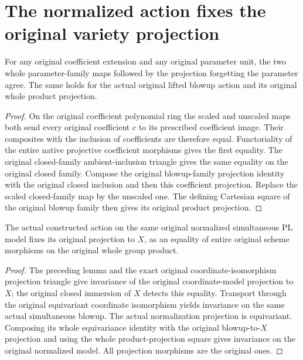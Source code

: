 \section{The normalized action fixes the original variety projection}

\begin{lemma}
\label{lem:pl-original-parameter-family-forgets-scaling}
\leanok
For any original coefficient extension and any original parameter unit,
the two whole parameter-family maps followed by the projection forgetting
the parameter agree. The same holds for the actual original lifted blowup
action and its original whole product projection.
\end{lemma}
\begin{proof}
On the original coefficient polynomial ring the scaled and unscaled maps
both send every original coefficient $c$ to its prescribed coefficient image.
Their composites with the inclusion of coefficients are therefore equal.
Functoriality of the entire native projective coefficient morphisms gives
the first equality. The original closed-family ambient-inclusion triangle
gives the same equality on the original closed family. Compose the original
blowup-family projection identity with the original closed inclusion and
then this coefficient projection. Replace the scaled closed-family map by
the unscaled one. The defining Cartesian square of the original blowup
family then gives its original product projection.
\end{proof}

\begin{theorem}
\label{thm:pl-original-normalized-projection-action-invariant}
\leanok
{}
The actual constructed action on the same original normalized simultaneous
PL model fixes its original projection to $X$, as an equality of entire
original scheme morphisms on the original whole group product.
\end{theorem}
\begin{proof}
The preceding lemma and the exact original coordinate-isomorphism projection
triangle give invariance of the original coordinate-model projection to $X$;
the original closed immersion of $X$ detects this equality. Transport through
the original equivariant coordinate isomorphism yields invariance on the same
actual simultaneous blowup. The actual normalization projection is
equivariant. Composing its whole equivariance identity with the original
blowup-to-$X$ projection and using the whole product-projection square gives
invariance on the original normalized model. All projection morphisms are
the original ones.
\end{proof}
